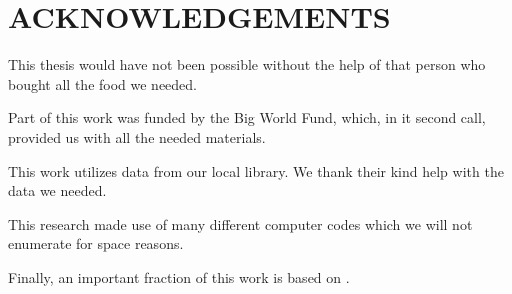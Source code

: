 \chapter*{ACKNOWLEDGEMENTS} 

This thesis would have not been possible without the help of that
      person who bought all the food we needed.
      
      Part of this work was funded by the Big World Fund, which, in
      it second call, provided us with all the needed materials.
      
      This work utilizes data from our local library. We thank their
      kind help with the data we needed.
      
      This research made use of many different computer codes which
      we will not enumerate for space reasons.

      Finally, an important fraction of this work is based on \citet{1996ima..book.....C}.

%
